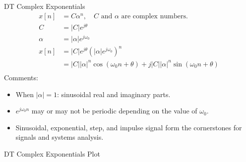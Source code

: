 \begin{frame}[plain]
    {
        {
            \centering
            
        }
    }
\end{frame}



\begin{frame}[plain]{DT Complex Exponentials}
    \begin{align*}
        x[n] &= C\alpha^n, \quad C \text{ and } \alpha \text{ are complex numbers.}\\
        C &= |C|e^{j\theta}\\
        \alpha &= |\alpha|e^{j\omega_0}\\
        x[n] &= |C|e^{j\theta}\left(|\alpha|e^{j\omega_0}\right)^n\\
        &= |C||\alpha|^n\cos(\omega_0n + \theta) + j|C||\alpha|^n\sin(\omega_0n + \theta)\\
    \end{align*}
    Comments:
    \begin{itemize}
      \item When $|\alpha| = 1$: sinusoidal real and imaginary parts.
      \item $e^{j\omega_0 n}$ may or may not be periodic depending on the value of $\omega_0$.
      \item Sinusoidal, exponential, step, and impulse signal form the cornerstones for signals and systems analysis.
    \end{itemize}
\end{frame}





\begin{frame}[plain]{DT Complex Exponentials Plot}
    {
        {
            \centering
            
        }
    }
\end{frame}





